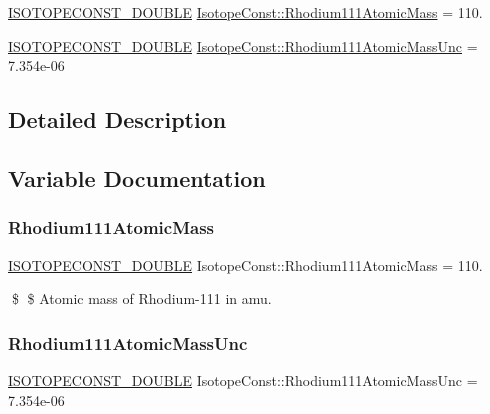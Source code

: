 \begin{DoxyCompactItemize}
\item 
\mbox{\hyperlink{group___isotope_const-_macros_ga8f45a7272ce02c0b4c65c44636ed719a}{I\+S\+O\+T\+O\+P\+E\+C\+O\+N\+S\+T\+\_\+\+D\+O\+U\+B\+LE}} \mbox{\hyperlink{group___isotope_const-_rhodium-_rh111_ga4d1bbbdf4ecf7323fb843a37983ea67e}{Isotope\+Const\+::\+Rhodium111\+Atomic\+Mass}} = 110.
\item 
\mbox{\hyperlink{group___isotope_const-_macros_ga8f45a7272ce02c0b4c65c44636ed719a}{I\+S\+O\+T\+O\+P\+E\+C\+O\+N\+S\+T\+\_\+\+D\+O\+U\+B\+LE}} \mbox{\hyperlink{group___isotope_const-_rhodium-_rh111_gabe6fdf7cdc654e7caa1ba55a13b60e53}{Isotope\+Const\+::\+Rhodium111\+Atomic\+Mass\+Unc}} = 7.\+354e-\/06
\end{DoxyCompactItemize}


\subsection{Detailed Description}


\subsection{Variable Documentation}
\mbox{\label{group___isotope_const-_rhodium-_rh111_ga4d1bbbdf4ecf7323fb843a37983ea67e}} 
\subsubsection{\texorpdfstring{Rhodium111\+Atomic\+Mass}{Rhodium111AtomicMass}}
{\footnotesize\ttfamily \mbox{\hyperlink{group___isotope_const-_macros_ga8f45a7272ce02c0b4c65c44636ed719a}{I\+S\+O\+T\+O\+P\+E\+C\+O\+N\+S\+T\+\_\+\+D\+O\+U\+B\+LE}} Isotope\+Const\+::\+Rhodium111\+Atomic\+Mass = 110.}

\$ \$ Atomic mass of Rhodium-\/111 in amu. \mbox{\label{group___isotope_const-_rhodium-_rh111_gabe6fdf7cdc654e7caa1ba55a13b60e53}} 
\subsubsection{\texorpdfstring{Rhodium111\+Atomic\+Mass\+Unc}{Rhodium111AtomicMassUnc}}
{\footnotesize\ttfamily \mbox{\hyperlink{group___isotope_const-_macros_ga8f45a7272ce02c0b4c65c44636ed719a}{I\+S\+O\+T\+O\+P\+E\+C\+O\+N\+S\+T\+\_\+\+D\+O\+U\+B\+LE}} Isotope\+Const\+::\+Rhodium111\+Atomic\+Mass\+Unc = 7.\+354e-\/06}

